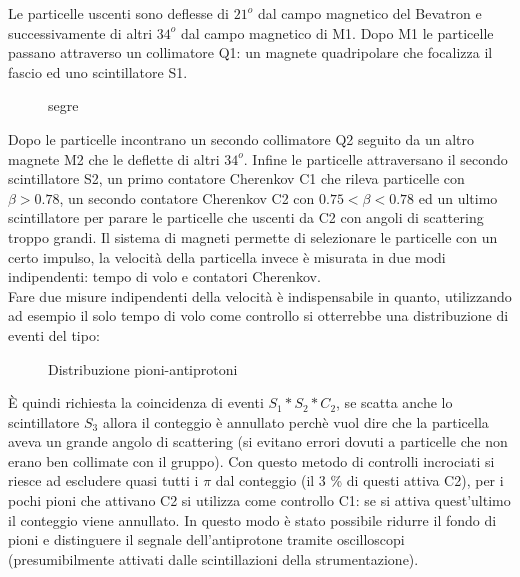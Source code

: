 Le particelle uscenti sono deflesse di $21^o$ dal campo magnetico del Bevatron e successivamente di altri $34^o$ dal campo magnetico di M1. Dopo M1 le particelle passano attraverso un collimatore Q1: un magnete quadripolare che focalizza il fascio ed uno scintillatore S1. 
\begin{figure}[H]
    \centering
    \caption{segre}
    \label{fig:segre}
\end{figure}
Dopo le particelle incontrano un secondo collimatore Q2 seguito da un altro magnete M2 che le deflette di altri $34^o$. Infine le particelle attraversano il secondo scintillatore S2, un primo contatore Cherenkov C1 che rileva particelle con $\beta>0.78$, un secondo contatore Cherenkov C2 con $0.75< \beta<0.78$ ed un ultimo scintillatore per parare le particelle che uscenti da C2 con angoli di scattering troppo grandi.
Il sistema di magneti permette di selezionare le particelle con un certo impulso, la velocità della particella invece è misurata in due modi indipendenti: tempo di volo e contatori Cherenkov.\\
Fare due misure indipendenti della velocità è indispensabile in quanto, utilizzando ad esempio il solo tempo di volo come controllo si otterrebbe una distribuzione di eventi del tipo:
\begin{figure}[H]
    \centering
    \caption{Distribuzione pioni-antiprotoni}
    \label{fig:distribuzione-pioni-antiprotoni}
\end{figure}
È quindi richiesta la coincidenza di eventi $S_1 * S_2 * C_2$, se scatta anche lo scintillatore $S_3$ allora il conteggio è annullato perchè vuol dire che la particella aveva un grande angolo di scattering (si evitano errori dovuti a particelle che non erano ben collimate con il gruppo). Con questo metodo di controlli incrociati si riesce ad escludere quasi tutti i $\pi$ dal conteggio (il 3 \% di questi attiva C2), per i pochi pioni che attivano C2 si utilizza come controllo C1: se si attiva quest'ultimo il conteggio viene annullato. In questo modo è stato possibile ridurre il fondo di pioni e distinguere il segnale dell'antiprotone tramite oscilloscopi (presumibilmente attivati dalle scintillazioni della strumentazione).
